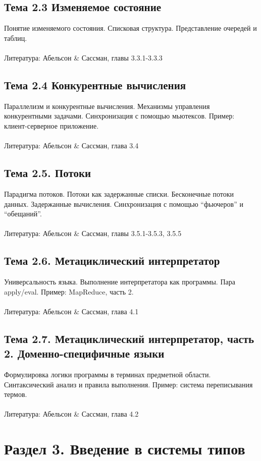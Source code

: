 \documentclass[a4paper,11pt]{article}
\begin{document}
\subsection*{Тема 2.3 Изменяемое состояние}
Понятие изменяемого состояния. Списковая структура. Представление очередей
и таблиц.
\\\\
Литература: Абельсон \& Сассман, главы 3.3.1-3.3.3

\subsection*{Тема 2.4 Конкурентные вычисления}
Параллелизм и конкурентные вычисления. Механизмы управления конкурентными
задачами. Синхронизация с помощью мьютексов. Пример: клиент-серверное приложение.
\\\\
Литература: Абельсон \& Сассман, глава 3.4

\subsection*{Тема 2.5. Потоки}
Парадигма потоков. Потоки как задержанные списки. Бесконечные потоки данных.
Задержанные вычисления. Синхронизация с помощью ``фьючеров'' и ``обещаний''.
\\\\
Литература: Абельсон \& Сассман, главы 3.5.1-3.5.3, 3.5.5

\subsection*{Тема 2.6. Метациклический интерпретатор}
Универсальность языка. Выполнение интерпретатора как программы. Пара apply/eval.
Пример: MapReduce, часть 2.
\\\\
Литература: Абельсон \& Сассман, глава 4.1

\subsection*{Тема 2.7. Метациклический интерпретатор, часть 2. Доменно-специфичные языки}
Формулировка логики программы в терминах предметной области. Синтаксический
анализ и правила выполнения. Пример: система переписывания термов.
\\\\
Литература: Абельсон \& Сассман, глава 4.2

\section*{Раздел 3. Введение в системы типов}
\end{document}
